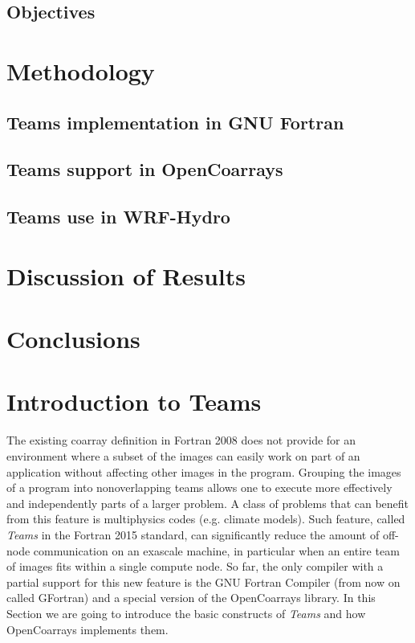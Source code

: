 \subsection{Objectives}

\section{Methodology}
\subsection{Teams implementation in GNU Fortran}
\subsection{Teams support in OpenCoarrays}
\subsection{Teams use in WRF-Hydro}

\section{Discussion of Results}

\section{Conclusions}

\section{Introduction to Teams}\label{sec:teams}
The existing coarray definition in Fortran 2008 does not provide for an environment
where a subset of the images can easily work on part of an application without affecting
other images in the program.  Grouping the images of a program into nonoverlapping
teams allows one to execute more effectively and independently parts of a larger
problem.  A class of problems that can benefit from this feature is multiphysics codes
(e.g.  climate models).
Such feature, called \textit{Teams} in the Fortran 2015 standard, can significantly reduce the amount of off-node
communication on an exascale machine, in particular when an entire team of images
fits within a single compute node.
So far, the only compiler with a partial support for this new feature is the GNU Fortran Compiler (from now on
called GFortran) and a special version of the OpenCoarrays library.
In this Section we are going to introduce the basic constructs of \textit{Teams} and how OpenCoarrays implements them.


